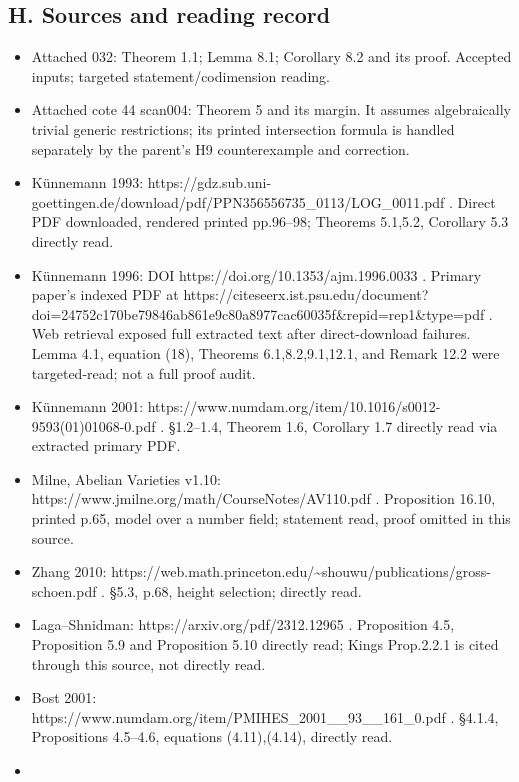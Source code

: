 \subsection{H. Sources and reading
record}\label{h.-sources-and-reading-record}

\begin{itemize}
\tightlist
\item
  Attached 032: Theorem 1.1; Lemma 8.1; Corollary 8.2 and its proof.
  Accepted inputs; targeted statement/codimension reading.
\item
  Attached cote 44 scan004: Theorem 5 and its margin. It assumes
  algebraically trivial generic restrictions; its printed intersection
  formula is handled separately by the parent's H9 counterexample and
  correction.
\item
  Künnemann 1993:
  https://gdz.sub.uni-goettingen.de/download/pdf/PPN356556735\_0113/LOG\_0011.pdf
  . Direct PDF downloaded, rendered printed pp.96--98; Theorems 5.1,5.2,
  Corollary 5.3 directly read.
\item
  Künnemann 1996: DOI https://doi.org/10.1353/ajm.1996.0033 . Primary
  paper's indexed PDF at
  https://citeseerx.ist.psu.edu/document?doi=24752c170be79846ab861e9c80a8977cac60035f\&repid=rep1\&type=pdf
  . Web retrieval exposed full extracted text after direct-download
  failures. Lemma 4.1, equation (18), Theorems 6.1,8.2,9.1,12.1, and
  Remark 12.2 were targeted-read; not a full proof audit.
\item
  Künnemann 2001:
  https://www.numdam.org/item/10.1016/s0012-9593(01)01068-0.pdf .
  §1.2--1.4, Theorem 1.6, Corollary 1.7 directly read via extracted
  primary PDF.
\item
  Milne, Abelian Varieties v1.10:
  https://www.jmilne.org/math/CourseNotes/AV110.pdf . Proposition 16.10,
  printed p.65, model over a number field; statement read, proof omitted
  in this source.
\item
  Zhang 2010:
  https://web.math.princeton.edu/\textasciitilde shouwu/publications/gross-schoen.pdf
  . §5.3, p.68, height selection; directly read.
\item
  Laga--Shnidman: https://arxiv.org/pdf/2312.12965 . Proposition 4.5,
  Proposition 5.9 and Proposition 5.10 directly read; Kings Prop.2.2.1
  is cited through this source, not directly read.
\item
  Bost 2001:
  https://www.numdam.org/item/PMIHES\_2001\_\_93\_\_161\_0.pdf . §4.1.4,
  Propositions 4.5--4.6, equations (4.11),(4.14), directly read.
\item

\end{itemize}

